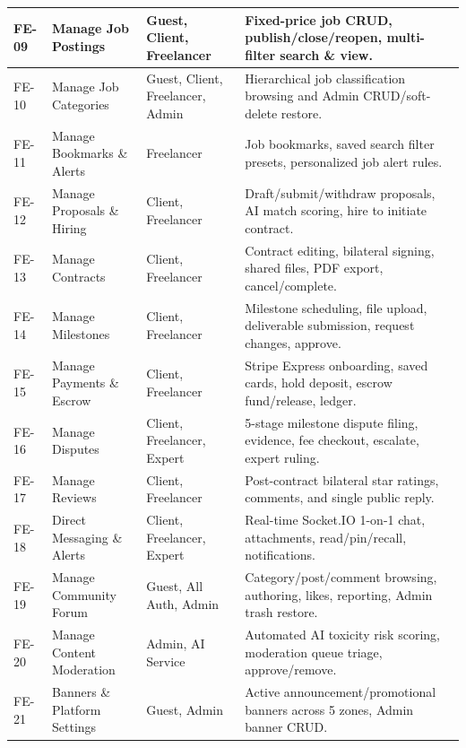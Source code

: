 \begin{longtable}{|C{1.4cm}|L{3.9cm}|L{2.8cm}|L{6.5cm}|}
FE-09 & Manage Job Postings & Guest, Client, Freelancer & Fixed-price job CRUD, publish/close/reopen, multi-filter search \& view. \\ \hline
FE-10 & Manage Job Categories & Guest, Client, Freelancer, Admin & Hierarchical job classification browsing and Admin CRUD/soft-delete restore. \\ \hline
FE-11 & Manage Bookmarks \& Alerts & Freelancer & Job bookmarks, saved search filter presets, personalized job alert rules. \\ \hline
FE-12 & Manage Proposals \& Hiring & Client, Freelancer & Draft/submit/withdraw proposals, AI match scoring, hire to initiate contract. \\ \hline
FE-13 & Manage Contracts & Client, Freelancer & Contract editing, bilateral signing, shared files, PDF export, cancel/complete. \\ \hline
FE-14 & Manage Milestones & Client, Freelancer & Milestone scheduling, file upload, deliverable submission, request changes, approve. \\ \hline
FE-15 & Manage Payments \& Escrow & Client, Freelancer & Stripe Express onboarding, saved cards, hold deposit, escrow fund/release, ledger. \\ \hline
FE-16 & Manage Disputes & Client, Freelancer, Expert & 5-stage milestone dispute filing, evidence, fee checkout, escalate, expert ruling. \\ \hline
FE-17 & Manage Reviews & Client, Freelancer & Post-contract bilateral star ratings, comments, and single public reply. \\ \hline
FE-18 & Direct Messaging \& Alerts & Client, Freelancer, Expert & Real-time Socket.IO 1-on-1 chat, attachments, read/pin/recall, notifications. \\ \hline
FE-19 & Manage Community Forum & Guest, All Auth, Admin & Category/post/comment browsing, authoring, likes, reporting, Admin trash restore. \\ \hline
FE-20 & Manage Content Moderation & Admin, AI Service & Automated AI toxicity risk scoring, moderation queue triage, approve/remove. \\ \hline
FE-21 & Banners \& Platform Settings & Guest, Admin & Active announcement/promotional banners across 5 zones, Admin banner CRUD. \\ \hline
\end{longtable}
\endgroup
